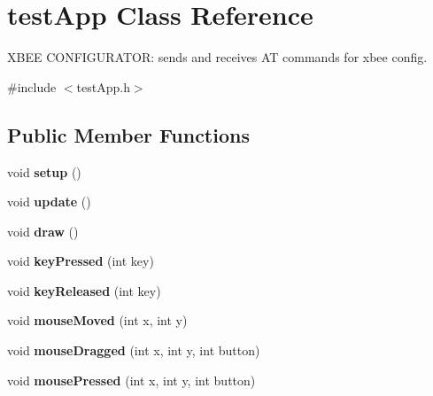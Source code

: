 \hypertarget{classtest_app}{
\section{testApp Class Reference}
\label{classtest_app}
}


XBEE CONFIGURATOR: sends and receives AT commands for xbee config.  




{\ttfamily \#include $<$testApp.h$>$}

\subsection*{Public Member Functions}
\begin{DoxyCompactItemize}
\item 
\hypertarget{classtest_app_ad431db15b6150b965cd52bcba8e16e11}{
void {\bfseries setup} ()}
\label{classtest_app_ad431db15b6150b965cd52bcba8e16e11}

\item 
\hypertarget{classtest_app_afb39d201aec71a295b7609876bf7d0c6}{
void {\bfseries update} ()}
\label{classtest_app_afb39d201aec71a295b7609876bf7d0c6}

\item 
\hypertarget{classtest_app_af869cba67b1dab8481f8d0e216d59dcd}{
void {\bfseries draw} ()}
\label{classtest_app_af869cba67b1dab8481f8d0e216d59dcd}

\item 
\hypertarget{classtest_app_a904d147c7e532cb92656d5dd4895cd26}{
void {\bfseries keyPressed} (int key)}
\label{classtest_app_a904d147c7e532cb92656d5dd4895cd26}

\item 
\hypertarget{classtest_app_a1116a10088e4932f6d482efe723cd45e}{
void {\bfseries keyReleased} (int key)}
\label{classtest_app_a1116a10088e4932f6d482efe723cd45e}

\item 
\hypertarget{classtest_app_a33541b19eff9f8285b2487bfc146d58b}{
void {\bfseries mouseMoved} (int x, int y)}
\label{classtest_app_a33541b19eff9f8285b2487bfc146d58b}

\item 
\hypertarget{classtest_app_a075bcc2be16fd8f3eaa9162fb40a0a1f}{
void {\bfseries mouseDragged} (int x, int y, int button)}
\label{classtest_app_a075bcc2be16fd8f3eaa9162fb40a0a1f}

\item 
\hypertarget{classtest_app_a3f200702ce91859cac2872a39302679d}{
void {\bfseries mousePressed} (int x, int y, int button)}
\label{classtest_app_a3f200702ce91859cac2872a39302679d}


\end{DoxyCompactItemize}
